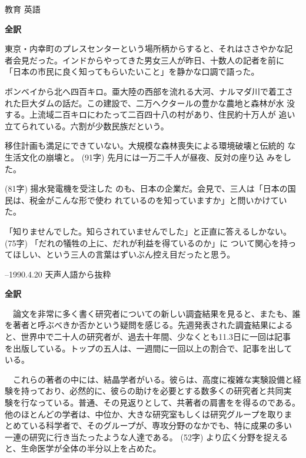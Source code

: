 \documentclass[fleqn]{jbook}
\begin{document}
\begin{answer}{教育 英語}{}

\begin{subanswers}
\SubAnswer 
{\bf 全訳}

  東京・内幸町のプレスセンターという場所柄からすると、それはささやかな記
 者会見だった。インドからやってきた男女三人が昨日、十数人の記者を前に
 「日本の市民に良く知ってもらいたいこと」を静かな口調で語った。

  ボンベイから北へ四百キロ。亜大陸の西部を流れる大河、ナルマダ川で着工さ
 れた巨大ダムの話だ。この建設で、二万ヘクタールの豊かな農地と森林が水
 没する。上流域二百キロにわたって二百四十八の村があり、住民約十万人が
 追い立てられている。六割が少数民族だという。

 移住計画も満足にできていない。大規模な森林喪失による環境破壊と伝統的
 な生活文化の崩壊と。 (91字) 先月には一万二千人が昼夜、反対の座り込
 みをした。
 
 (81字) 揚水発電機を受注した
のも、日本の企業だ。会見で、三人は「日本の国民は、税金がこんな形で使わ
れているのを知っていますか」と問いかけていた。

「知りませんでした。知らされていませんでした」と正直に答えるしかない。
(75字) 「だれの犠牲の上に、だれが利益を得ているのか」に
ついて関心を持ってほしい、という三人の言葉はずいぶん控え目だったと思う。

 \begin{flushright}
     --1990.4.20 天声人語から抜粋
  \end{flushright}

\SubAnswer
 {\bf 全訳}

　論文を非常に多く書く研究者についての新しい調査結果を見ると、またも、誰
を著者と呼ぶべきか否かという疑問を感じる。先週発表された調査結果による
と、世界中で二十人の研究者が、過去十年間、少なくとも11.3日に一回は記事
を出版している。トップの五人は、一週間に一回以上の割合で、記事を出して
いる。

　これらの著者の中には、結晶学者がいる。彼らは、高度に複雑な実験設備と経
験を持っており、必然的に、彼らの助けを必要とする数多くの研究者と共同実
験を行なっている。普通、その見返りとして、共著者の肩書をを得るのである。
他のほとんどの学者は、中位か、大きな研究室もしくは研究グループを取りま
とめている科学者で、そのグループが、専攻分野のなかでも、特に成果の多い
一連の研究に行き当たったような人達である。
(52字)
より広く分野を捉えると、生命医学が全体の半分以上を占めた。


\end{subanswers}
\end{answer}
\end{document}
